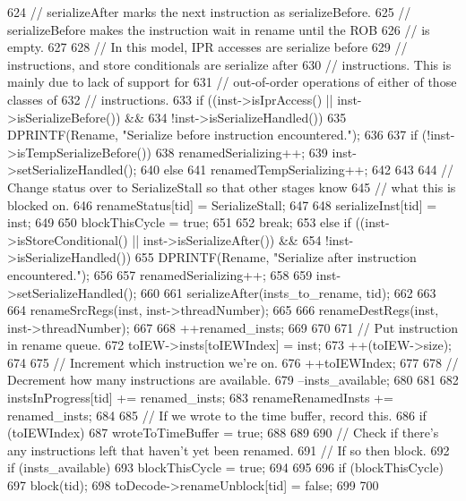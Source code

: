 \begin{DoxyCode}
{{624         // serializeAfter marks the next instruction as serializeBefore.
625         // serializeBefore makes the instruction wait in rename until the ROB
626         // is empty.
627 
628         // In this model, IPR accesses are serialize before
629         // instructions, and store conditionals are serialize after
630         // instructions.  This is mainly due to lack of support for
631         // out-of-order operations of either of those classes of
632         // instructions.
633         if ((inst->isIprAccess() || inst->isSerializeBefore()) &&
634             !inst->isSerializeHandled()) {
635             DPRINTF(Rename, "Serialize before instruction encountered.\n");
636 
637             if (!inst->isTempSerializeBefore()) {
638                 renamedSerializing++;
639                 inst->setSerializeHandled();
640             } else {
641                 renamedTempSerializing++;
642             }
643 
644             // Change status over to SerializeStall so that other stages know
645             // what this is blocked on.
646             renameStatus[tid] = SerializeStall;
647 
648             serializeInst[tid] = inst;
649 
650             blockThisCycle = true;
651 
652             break;
653         } else if ((inst->isStoreConditional() || inst->isSerializeAfter()) &&
654                    !inst->isSerializeHandled()) {
655             DPRINTF(Rename, "Serialize after instruction encountered.\n");
656 
657             renamedSerializing++;
658 
659             inst->setSerializeHandled();
660 
661             serializeAfter(insts_to_rename, tid);
662         }
663 
664         renameSrcRegs(inst, inst->threadNumber);
665 
666         renameDestRegs(inst, inst->threadNumber);
667 
668         ++renamed_insts;
669 
670 
671         // Put instruction in rename queue.
672         toIEW->insts[toIEWIndex] = inst;
673         ++(toIEW->size);
674 
675         // Increment which instruction we're on.
676         ++toIEWIndex;
677 
678         // Decrement how many instructions are available.
679         --insts_available;
680     }
681 
682     instsInProgress[tid] += renamed_insts;
683     renameRenamedInsts += renamed_insts;
684 
685     // If we wrote to the time buffer, record this.
686     if (toIEWIndex) {
687         wroteToTimeBuffer = true;
688     }
689 
690     // Check if there's any instructions left that haven't yet been renamed.
691     // If so then block.
692     if (insts_available) {
693         blockThisCycle = true;
694     }
695 
696     if (blockThisCycle) {
697         block(tid);
698         toDecode->renameUnblock[tid] = false;
699     }
700 }
\end{DoxyCode}
